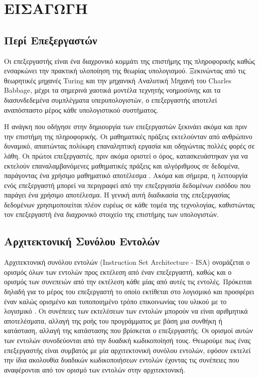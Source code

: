 \documentclass[11pt]{extarticle}
\let\stdsection\section
\renewcommand\section{\newpage\stdsection}
\begin{document}
\newpage
\renewcommand{\contentsname}{Περιεχόμενα}
\tableofcontents
\renewcommand{\listfigurename}{Κατάλογος Διαγραμμάτων}
\listoffigures
\renewcommand{\listtablename}{Κατάλογος Πινάκων}
\listoftables


\section{ΕΙΣΑΓΩΓΗ}
\subsection{Περί Επεξεργαστών}
Οι επεξεργαστής είναι ένα διαχρονικό κομμάτι της επιστήμης της πληροφορικής καθώς ενσαρκώνει την πρακτική υλοποίηση της θεωρίας υπολογισμού.
Ξεκινώντας από τις θεωρητικές μηχανές Turing και την μηχανική Αναλυτική Μηχανή του Charles Babbage, μέχρι τα σημερινά χαοτικά μοντέλα τεχνητής νοημοσύνης και τα διασυνδεδεμένα συμπλέγματα υπερυπολογιστών, ο επεξεργαστής αποτελεί αναπόσπαστο μέρος κάθε υπολογιστικού συστήματος.

Η ανάγκη που οδήγησε στην δημιουργία των επεξεργαστών ξεκινάει ακόμα και πριν την επιστήμη της πληροφορικής.
Οι μαθηματικές πράξεις εκτελούνταν από ανθρώπινο δυναμικό, απαιτώντας πολύωρη επαναληπτική εργασία και οδηγώντας πολλές φορές σε λάθη.
Οι πρώτοι επεξεργαστές, πριν ακόμα οριστεί ο όρος, κατασκευάστηκαν για να εκτελούν επαναλαμβανόμενες μαθηματικές πράξεις και αλγόριθμους σε δεδομένα, παράγοντας ένα χρήσιμο μαθηματικό αποτέλεσμα \cite{forouzan}.
Ακόμα και σήμερα, η λειτουργία ενός επεξεργαστή μπορεί να περιγραφεί από την επεξεργασία δεδομένων εισόδου που παράγει ένα χρήσιμο αποτέλεσμα.
Η γενική αυτή διαδικασία της επεξεργασίας δεδομένων χρησιμοποιείται πλέον ευρέως σε κάθε τομέα της τεχνολογίας, καθιστώντας τον επεξεργαστή ένα διαχρονικό στοιχείο της επιστήμης των υπολογιστών.

\subsection{Αρχιτεκτονική Συνόλου Εντολών}
Αρχιτεκτονική συνόλου εντολών (Instruction Set Architecture - ISA) ονομάζεται ο ορισμός όλων των εντολών προς εκτέλεση από έναν επεξεργαστή, καθώς και ο ορισμός των συνεπειών από την εκτέλεση κάθε μίας από αυτές τις εντολές.
Πρόκειται δηλαδή για το μέρος του επεξεργαστή το οποίο εκτίθεται στο λογισμικό και προσφέρει έναν καλώς ορισμένο και τυποποιημένο τρόπο επικοινωνίας του υλικού με το λογισμικό \cite{patterson}.
Οι συνέπειες των εκτελέσεων των εντολών μπορούν να είναι αριθμητικά αποτελέσματα, αλλαγή της ροής του προγράμματος με βάση μια συνθήκη ή κατάσταση, αλλαγή της κατάστασης που βρίσκεται ο επεξεργαστής. 
Οι ορισμοί αυτών των εντολών συνοδεύονται από την δυαδική κωδικοποίησή τους. 
Θεωρούμε πως ένας επεξεργαστής είναι συμβατός με μία αρχιτεκτονική συνόλου εντολών, εφόσον εκτελεί την ίδια ακολουθία δυαδικών κωδικοποιήσεων εντολών έχοντας τις συνέπειες που αναφέρονται από τον ορισμό των εντολών στην αρχιτεκτονική.
\hfill\newline
\end{document}
